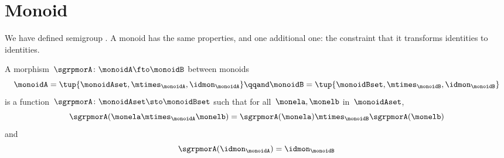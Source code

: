 \section{Monoid \whomos}

We have defined semigroup \whomo. A monoid \whomo has the same properties, and one additional one: the constraint that it transforms identities to identities.

\begin{ctdefinition}
  \label{def:monoid-mor}
  A morphism~$\sgrpmorA\colon \monoidA \fto \monoidB$ between monoids
  \begin{equation}
    \monoidA = \tup{\monoidAset, \mtimes_\monoidA, \idmon_\monoidA}
    \qqand
    \monoidB = \tup{\monoidBset, \mtimes_\monoidB, \idmon_\monoidB}
  \end{equation}
  is a function~$\sgrpmorA \colon \monoidAset \sto \monoidBset$ such that
  for all~$\monela, \monelb$ in~$\monoidAset$,
  \begin{equation}
    \label{eq:mon-mor-comp}
    \sgrpmorA (\monela \mtimes_{\monoidA} \monelb) = \sgrpmorA (\monela) \mtimes_{\monoidB}  \sgrpmorA(\monelb)
  \end{equation}
  and
  \begin{equation}
    \label{eq:mon-id-comp}
    \sgrpmorA (\idmon_\monoidA) = \idmon_{\monoidB}
  \end{equation}
\end{ctdefinition}
